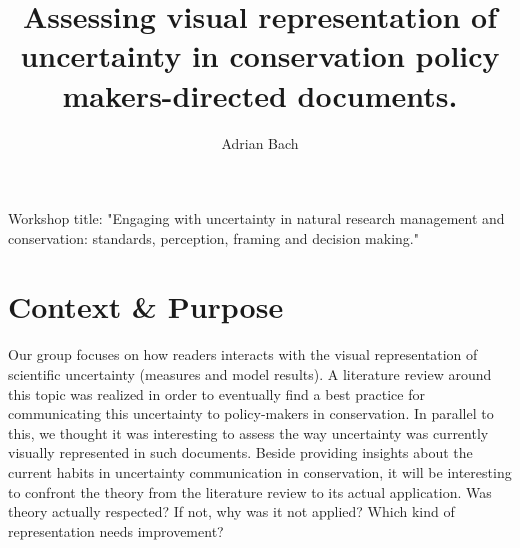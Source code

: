 \documentclass[12pt,a4paper]{article}
\author{Adrian Bach}
\title{Assessing visual representation of uncertainty in conservation policy makers-directed documents.}
\begin{document}
\maketitle

\tableofcontents

\vspace{\baselineskip}

Workshop title: "Engaging with uncertainty in natural research management and conservation: standards, perception, framing and decision making."

\section{Context \& Purpose}

Our group focuses on how readers interacts with the visual representation of scientific uncertainty (measures and model results).
A literature review around this topic was realized in order to eventually find a best practice for communicating this uncertainty to policy-makers in conservation.
In parallel to this, we thought it was interesting to assess the way uncertainty was currently visually represented in such documents.
Beside providing insights about the current habits in uncertainty communication in conservation, it will be interesting to confront the theory from the literature review to its actual application.
Was theory actually respected? If not, why was it not applied? Which kind of representation needs improvement?
\end{document}
